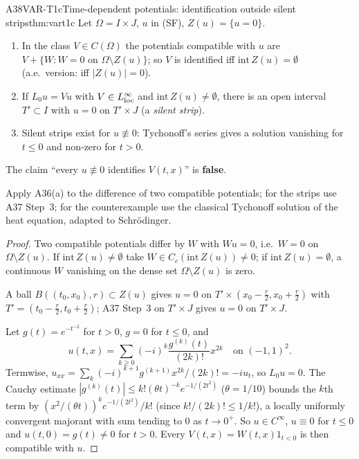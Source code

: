 \begin{dimcard}{A38}{VAR-T1c}{Time-dependent potentials: identification outside silent strips}{\proved}{thm:vart1c}
Let $\Omega=I\times J$, $u$ in (SF), $Z(u)=\{u=0\}$.
\begin{enumerate}[label=(\roman*)]
\item In the class $V\in C(\Omega)$ the potentials compatible with $u$ are $V+\{W:W=0\text{ on }\Omega\setminus Z(u)\}$; so $V$ is identified iff $\mathrm{int}\,Z(u)=\emptyset$ (a.e.\ version: iff $|Z(u)|=0$).
\item If $L_0u=Vu$ with $V\in L^\infty_{\rm loc}$ and $\mathrm{int}\,Z(u)\ne\emptyset$, there is an open interval $T'\subset I$ with $u=0$ on $T'\times J$ (a \emph{silent strip}).
\item Silent strips exist for $u\not\equiv0$: Tychonoff's series gives a solution vanishing for $t\le0$ and non-zero for $t>0$.
\end{enumerate}
The claim ``every $u\not\equiv0$ identifies $V(t,x)$'' is \textbf{false}.
\end{dimcard}

\begin{proofidea}
Apply A36(a) to the difference of two compatible potentials; for the strips use A37 Step~3; for the counterexample use the classical Tychonoff solution of the heat equation, adapted to Schr\"odinger.
\end{proofidea}

\begin{proof}
Two compatible potentials differ by $W$ with $Wu=0$, i.e.\ $W=0$ on $\Omega\setminus Z(u)$. If $\mathrm{int}\,Z(u)\ne\emptyset$ take $W\in C_c(\mathrm{int}\,Z(u))\ne0$; if $\mathrm{int}\,Z(u)=\emptyset$, a continuous $W$ vanishing on the dense set $\Omega\setminus Z(u)$ is zero.

A ball $B((t_0,x_0),r)\subset Z(u)$ gives $u=0$ on $T'\times(x_0-\tfrac r2,x_0+\tfrac r2)$ with $T'=(t_0-\tfrac r2,t_0+\tfrac r2)$; A37 Step~3 on $T'\times J$ gives $u=0$ on $T'\times J$.

Let $g(t)=e^{-t^{-2}}$ for $t>0$, $g=0$ for $t\le0$, and
\[
u(t,x)=\sum_{k\ge0}(-i)^k\frac{g^{(k)}(t)}{(2k)!}x^{2k}\quad\text{on }(-1,1)^2 .
\]
Termwise, $u_{xx}=\sum_k(-i)^{k+1}g^{(k+1)}x^{2k}/(2k)!=-iu_t$, so $L_0u=0$. The Cauchy estimate $|g^{(k)}(t)|\le k!(\theta t)^{-k}e^{-1/(2t^2)}$ ($\theta=1/10$) bounds the $k$th term by $(x^2/(\theta t))^k e^{-1/(2t^2)}/k!$ (since $k!/(2k)!\le1/k!$), a locally uniformly convergent majorant with sum tending to $0$ as $t\to0^+$. So $u\in C^\infty$, $u\equiv0$ for $t\le0$ and $u(t,0)=g(t)\ne0$ for $t>0$. Every $V(t,x)=W(t,x)1_{t<0}$ is then compatible with $u$.

\end{proof}

